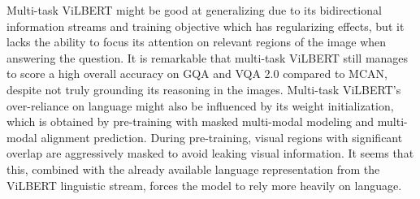 \documentclass{article}
\begin{document}

Multi-task ViLBERT might be good at generalizing due to its bidirectional information streams and training objective which has regularizing effects, but it lacks the ability to focus its attention on relevant regions of the image when answering the question. It is remarkable that multi-task ViLBERT still manages to score a high overall accuracy on GQA and VQA 2.0 compared to MCAN, despite not truly grounding its reasoning in the images. Multi-task ViLBERT's over-reliance on language might also be influenced by its weight initialization, which is obtained by pre-training with masked multi-modal modeling and multi-modal alignment prediction. During pre-training, visual regions with significant overlap are aggressively masked to avoid leaking visual information. It seems that this, combined with the already available language representation from the ViLBERT linguistic stream, forces the model to rely more heavily on language. %


\end{document}
